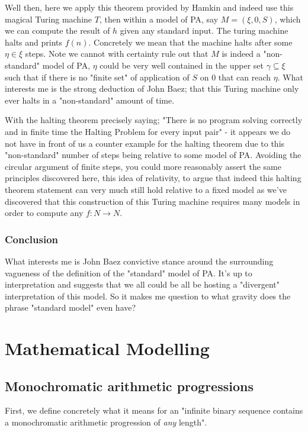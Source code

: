 \documentclass{article}
\begin{document}
Well then, here we apply this theorem provided by Hamkin and indeed use this magical Turing machine $T$, then within a model of PA, say $M = (\xi,0,S)$, which we can compute the result of $h$ given any standard input. The turing machine halts and prints $f(n)$. Concretely we mean that the machine halts after some $\eta \in \xi$ steps. Note we cannot with certainty rule out that $M$ is indeed a "non-standard" model of PA, $\eta$ could be very well contained in the upper set $\gamma \subseteq \xi$ such that if there is no "finite set" of application of $S$ on $0$ that can reach $\eta$. What interests me is the strong deduction of John Baez; that this Turing machine only ever halts in a "non-standard" amount of time.

With the halting theorem precisely saying; "There is no program solving correctly and in finite time the Halting Problem for every input pair" - it appears we do not have in front of us a counter example for the halting theorem due to this "non-standard" number of steps being relative to some model of PA. Avoiding the circular argument of finite steps, you could more reasonably assert the same principles discovered here, this idea of relativity, to argue that indeed this halting theorem statement can very much still hold relative to a fixed model as we've discovered that this construction of this Turing machine requires many models in order to compute any $f: N \rightarrow N$.

\subsubsection{Conclusion}
What interests me is John Baez convictive stance around the surrounding vagueness of the definition of the "standard" model of PA. It's up to interpretation and suggests that we all could be all be hosting a "divergent" interpretation of this model. So it makes me question to what gravity does the phrase "standard model" even have?

\pagebreak

\section{Mathematical Modelling}
\subsection{Monochromatic arithmetic progressions}
First, we define concretely what it means for an "infinite binary sequence contains a monochromatic arithmetic progression of \emph{any} length". 
\end{document}
